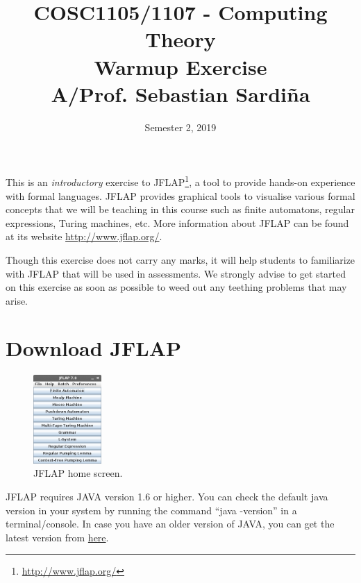 \documentclass[11pt]{article}
\title{COSC1105/1107 - Computing Theory \\
	\jflap Warmup Exercise \\
	A/Prof. Sebastian Sardi\~na
}
\date{Semester 2, 2019}
\newcommand{\name}[1]{{\textsf{#1}}}
\newcommand{\jflap}{\name{JFLAP}\xspace}
\begin{document}
 
\maketitle               %

This is an \emph{introductory} exercise to \jflap\footnote{\url{http://www.jflap.org/}}, a tool to provide hands-on experience with formal languages. \jflap provides graphical tools to visualise various formal concepts that we will be teaching in this course such as finite automatons, regular expressions, Turing machines, etc.
%
More information about \jflap  can be found at its website \url{http://www.jflap.org/}.
%

Though this exercise does not carry any marks, it will help students to familiarize with JFLAP that will be used in assessments.
%
We strongly advise to get started on this exercise as soon as possible to weed out any teething problems that may arise.
%

\section{Download JFLAP}\label{sec:downrun}

\begin{figure}
	\vspace{10pt}
	\begin{center}
	\includegraphics[width=0.23\textwidth]{img/jflap_home.png}
	\end{center}
	\caption{JFLAP home screen.}
	\label{fig:home}
\end{figure}
\jflap requires \name{JAVA} version 1.6 or higher. You can check the default java version in your system by running the command ``java -version'' in a terminal/console. In case you have an older version of \name{JAVA}, you can get the latest version from \href{http://java.com/en/download/manual.jsp}{here}.
\end{document}
